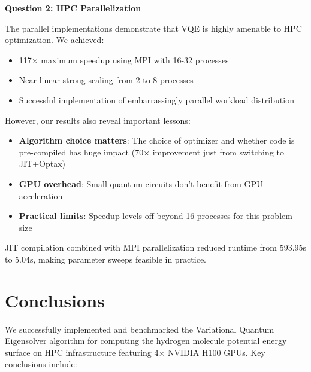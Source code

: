 \documentclass[11pt]{article}
\begin{document}
\textbf{Question 2: HPC Parallelization}

The parallel implementations demonstrate that VQE is highly amenable to HPC optimization. We achieved:
\begin{itemize}
    \item 117× maximum speedup using MPI with 16-32 processes
    \item Near-linear strong scaling from 2 to 8 processes
    \item Successful implementation of embarrassingly parallel workload distribution
\end{itemize}

However, our results also reveal important lessons:
\begin{itemize}
    \item \textbf{Algorithm choice matters}: The choice of optimizer and whether code is pre-compiled has huge impact (70× improvement just from switching to JIT+Optax)
    \item \textbf{GPU overhead}: Small quantum circuits don't benefit from GPU acceleration
    \item \textbf{Practical limits}: Speedup levels off beyond 16 processes for this problem size
\end{itemize}

JIT compilation combined with MPI parallelization reduced runtime from 593.95s to 5.04s, making parameter sweeps feasible in practice.

\section{Conclusions}

We successfully implemented and benchmarked the Variational Quantum Eigensolver algorithm for computing the hydrogen molecule potential energy surface on HPC infrastructure featuring 4$\times$ NVIDIA H100 GPUs. Key conclusions include:
\end{document}
